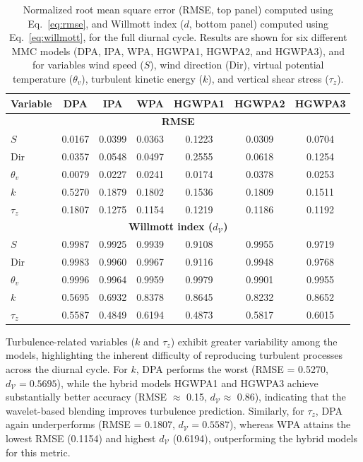 \begin{table}[htb!]
\centering
\caption{Normalized root mean square error (RMSE, top panel) computed using Eq.~\ref{eq:rmse}, and Willmott index ($d$, bottom panel) computed using Eq.~\ref{eq:willmott}, for the full diurnal cycle. Results are shown for six different MMC models (DPA, IPA, WPA, HGWPA1, HGWPA2, and HGWPA3), and for variables wind speed ($S$), wind direction (Dir), virtual potential temperature ($\theta_v$), turbulent kinetic energy ($k$), and vertical shear stress ($\tau_z$).}
\label{tab:fulldiurnal}
\begin{tabular}{lcccccc}
\toprule
Variable & DPA & IPA & WPA & HGWPA1 & HGWPA2 & HGWPA3 \\
\midrule
\multicolumn{7}{c}{\textbf{RMSE}} \\
\midrule
$S$        & 0.0167 & 0.0399 & 0.0363 & 0.1223 & 0.0309 & 0.0704 \\
Dir        & 0.0357 & 0.0548 & 0.0497 & 0.2555 & 0.0618 & 0.1254 \\
$\theta_v$ & 0.0079 & 0.0227 & 0.0241 & 0.0174 & 0.0378 & 0.0253 \\
$k$        & 0.5270 & 0.1879 & 0.1802 & 0.1536 & 0.1809 & 0.1511 \\
$\tau_z$   & 0.1807 & 0.1275 & 0.1154 & 0.1219 & 0.1186 & 0.1192 \\
\midrule
\multicolumn{7}{c}{\textbf{Willmott index ($d_\mathcal{V}$)}} \\
\midrule
$S$        & 0.9987 & 0.9925 & 0.9939 & 0.9108 & 0.9955 & 0.9719 \\
Dir        & 0.9983 & 0.9960 & 0.9967 & 0.9116 & 0.9948 & 0.9768 \\
$\theta_v$ & 0.9996 & 0.9964 & 0.9959 & 0.9979 & 0.9901 & 0.9955 \\
$k$        & 0.5695 & 0.6932 & 0.8378 & 0.8645 & 0.8232 & 0.8652 \\
$\tau_z$   & 0.5587 & 0.4849 & 0.6194 & 0.4873 & 0.5817 & 0.6015 \\
\bottomrule
\end{tabular}
\end{table}

Turbulence-related variables ($k$ and $\tau_z$) exhibit greater variability among the models, highlighting the inherent difficulty of reproducing turbulent processes across the diurnal cycle. For $k$, DPA performs the worst (RMSE = 0.5270, $d_{\mathcal{V}} = 0.5695$), while the hybrid models HGWPA1 and HGWPA3 achieve substantially better accuracy (RMSE $\approx$ 0.15, $d_{\mathcal{V}} \approx$ 0.86), indicating that the wavelet-based blending improves turbulence prediction. Similarly, for $\tau_z$, DPA again underperforms (RMSE = 0.1807, $d_{\mathcal{V}} = 0.5587$), whereas WPA attains the lowest RMSE (0.1154) and highest $d_{\mathcal{V}}$ (0.6194), outperforming the hybrid models for this metric.

